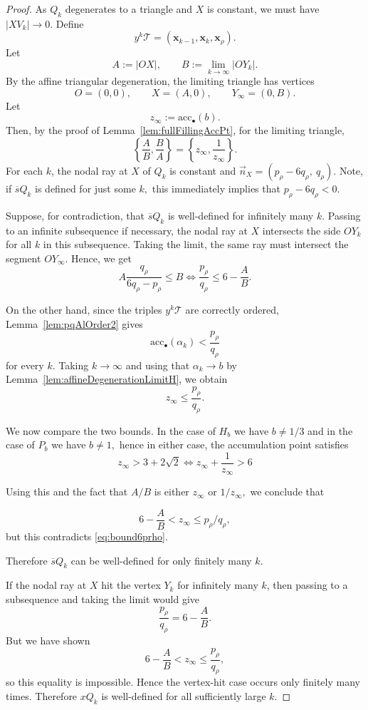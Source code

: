 \documentclass[11pt, reqno]{amsart}
\theoremstyle{remark}
\numberwithin{equation}{subsection}
\numberwithin{figure}{section}
\theoremstyle{customremark}
\newcommand{\Tt}{\mathcal{T}}
\newcommand{\ov}{\overline}
\newcommand{\acc}{\mathrm{acc}}
\begin{document}
\begin{proof}
As $Q_k$ degenerates to a triangle and $X$ is constant, we must have $|XV_k| \to 0.$
Define
\[
        y^k\Tt=(\bm{x}_{k-1},\bm{x}_k,\bm{x}_\rho).
\]
Let
\[
        A:=|OX|,
        \qquad
        B:=\lim_{k\to\infty}|OY_k|.
\]
By the affine triangular degeneration, the limiting triangle has vertices
\[
        O=(0,0),\qquad X=(A,0),\qquad Y_\infty=(0,B).
\]
Let
\[
        z_\infty:=\acc_\bullet(b).
\]
Then, by the proof of Lemma~\ref{lem:fullFillingAccPt}, for the limiting triangle,
\[
        \left\{\frac{A}{B},\frac{B}{A}\right\}
        =
        \left\{z_\infty,\frac{1}{z_\infty}\right\}.
\]
For each $k$, the nodal ray at $X$ of $Q_k$ is constant and $\vec n_X=(p_\rho-6q_\rho,\ q_\rho).$ Note, if $\ov{s}Q_k$ is defined for just some $k,$ this immediately implies that $p_\rho-6q_\rho<0$. 

Suppose, for contradiction, that $\ov{s}Q_k$ is well-defined for infinitely
many $k$. Passing to an infinite subsequence if necessary, the nodal ray at
$X$ intersects the side $OY_k$ for all $k$ in this subsequence. Taking the
limit, the same ray must intersect the segment $OY_\infty$. Hence, we get
\begin{equation} \label{eq:bound6prho}
        A \frac{q_\rho}{6q_\rho-p_\rho}\leq B \iff  \frac{p_\rho}{q_\rho}
        \leq
        6-\frac{A}{B}.
\end{equation}


On the other hand, since the triples $y^k\Tt$ are correctly ordered,
Lemma~\ref{lem:pqAlOrder2} gives
\[
        \acc_\bullet(\alpha_k)<\frac{p_\rho}{q_\rho}
\]
for every $k$. Taking $k\to\infty$ and using that $\alpha_k\to b$ by Lemma~\ref{lem:affineDegenerationLimitH}, we obtain
\[
        z_\infty\leq \frac{p_\rho}{q_\rho}.
\]

We now compare the two bounds. In the case of $H_b$ we have $b \neq 1/3$ and in the case of $P_b$ we have $b \neq 1,$ hence in either case, the accumulation point
satisfies
\[
        z_\infty>3+2\sqrt{2} \iff  z_\infty+\frac{1}{z_\infty}>6
\]

Using this and the fact that $A/B$ is either $z_\infty$ or $1/z_\infty,$ we conclude that 

\[
        6-\frac{A}{B}<z_\infty \leq p_\rho/q_\rho,
\]
but this contradicts \eqref{eq:bound6prho}.

Therefore $\ov{s}Q_k$ can be well-defined for only
finitely many $k$. 

If the nodal ray at \(X\) hit the vertex \(Y_k\) for infinitely many \(k\),
then passing to a subsequence and taking the limit would give
\[
        \frac{p_\rho}{q_\rho}=6-\frac{A}{B}.
\]
But we have shown
\[
        6-\frac{A}{B}<z_\infty\leq \frac{p_\rho}{q_\rho},
\]
so this equality is impossible. Hence the vertex-hit case occurs only
finitely many times. Therefore $xQ_k$ is
well-defined for all sufficiently large $k$.
\end{proof}
\end{document}
